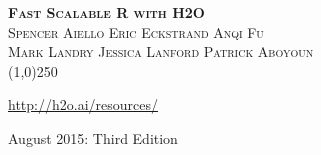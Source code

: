 







\thispagestyle{empty} %

\begin{center}
\textsc{\Large\bf{Fast Scalable R with H2O}}
\\
\bigskip
\textsc{\small{Spencer Aiello \hspace{10pt} Eric Eckstrand \hspace{10pt} Anqi Fu \\  \hspace{10pt} Mark Landry  \hspace{10pt}  Jessica Lanford \hspace{10pt}  Patrick Aboyoun }}
\\
\bigskip
\line(1,0){250}  %

{\url{http://h2o.ai/resources/}}

\bigskip
August 2015: Third Edition 
\\%
\bigskip
\end{center}

\null\vfill
\begin{figure}[!b]
\noindent{}
\end{figure}

\newpage
\restoregeometry

\null\vfill %
\thispagestyle{empty} %


